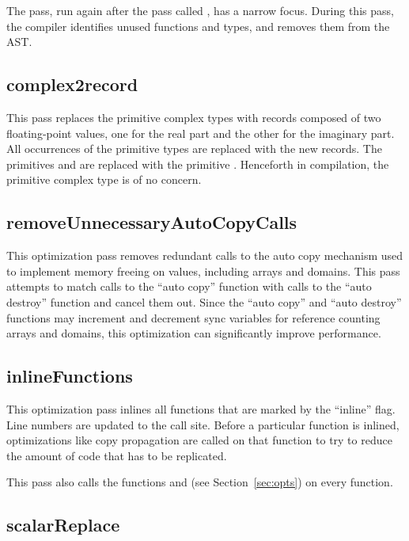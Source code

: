 \documentclass[10pt]{article}
\begin{document}
The  pass, run again after the pass called
, has a narrow focus.  During this pass, the
compiler identifies unused functions and types, and removes them from
the AST.

\subsection{complex2record}

This pass replaces the primitive complex types  with
records composed of two floating-point values, one for the real part
and the other for the imaginary part.  All occurrences of the
primitive types are replaced with the new records.  The primitives
 and  are replaced with the primitive
.  Henceforth in compilation, the primitive complex
type is of no concern.

\subsection{removeUnnecessaryAutoCopyCalls}

This optimization pass removes redundant calls to the auto copy
mechanism used to implement memory freeing on values, including arrays
and domains.  This pass attempts to match calls to the ``auto copy''
function with calls to the ``auto destroy'' function and cancel them
out.  Since the ``auto copy'' and ``auto destroy'' functions may
increment and decrement sync variables for reference counting arrays
and domains, this optimization can significantly improve performance.

\subsection{inlineFunctions}

This optimization pass inlines all functions that are marked by the
``inline'' flag.  Line numbers are updated to the call site.  Before a
particular function is inlined, optimizations like copy propagation
are called on that function to try to reduce the amount of code that
has to be replicated.

This pass also calls the functions  and
 (see Section~\ref{sec:opts}) on every function.

\subsection{scalarReplace}
\end{document}
